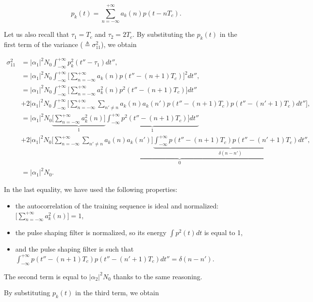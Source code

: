 \documentclass [a4paper, 11pt] {article}
\begin{document}
\begin{solution}
\begin{enumerate}
\begin{equation}
    p_k(t) = \sum_{n=-\infty}^{+\infty}a_k(n)p(t-nT_c).
\end{equation}

Let us also recall that $\tau_1 = T_c$ and $\tau_2 = 2T_c$.
By substituting the $p_k(t)$ in the first term of the variance ($\triangleq\sigma_{11}^2$), we obtain

\begin{align}
    \sigma_{11}^2 &=|\alpha_1|^2N_0 \int_{-\infty}^{+\infty}p_k^2(t''-\tau_{1})dt'', \\
    &= |\alpha_1|^2N_0 \int_{-\infty}^{+\infty}\Big[ \sum_{n=-\infty}^{+\infty}a_k(n)p(t''- (n+1)T_c) \Big]^2 dt'',\\
    &= |\alpha_1|^2N_0 \int_{-\infty}^{+\infty}\Big[ \sum_{n=-\infty}^{+\infty}a^2_k(n)p^2(t''- (n+1)T_c) \Big] dt'' \\
    &+ 2|\alpha_1|^2N_0 \int_{-\infty}^{+\infty}\Big[\sum_{n=-\infty}^{+\infty}\sum_{n'\neq n}a_k(n)a_k(n')p(t''- (n+1)T_c) p(t''- (n'+1)T_c) dt''\Big] \nonumber,\\
    &= |\alpha_1|^2N_0 \underbrace{\Big[ \sum_{n=-\infty}^{+\infty}a^2_k(n) \Big]}_{1} \underbrace{\int_{-\infty}^{+\infty} p^2(t''- (n+1)T_c) \Big] dt''}_{1} \\
    &+ 2|\alpha_1|^2N_0 \underbrace{\Big[\sum_{n=-\infty}^{+\infty}\sum_{n'\neq n}a_k(n)a_k(n') \Big] \underbrace{\int_{-\infty}^{+\infty} p(t''- (n+1)T_c) p(t''- (n'+1)T_c) dt''}_{\delta(n-n')}}_{0}\nonumber,\\
    &= |\alpha_1|^2N_0.
\end{align}

In the last equality, we have used the following properties:

\begin{itemize}
    \item the autocorrelation of the training sequence is ideal and normalized: $\big[ \sum_{n=-\infty}^{+\infty}a^2_k(n)\big] = 1$,
    \item the pulse shaping filter is normalized, so its energy $\int p^2(t) dt$ is equal to 1,
    \item and the pulse shaping filter is such that $\int_{-\infty}^{+\infty} p(t''- (n+1)T_c) p(t''- (n'+1)T_c) dt'' = \delta(n-n')$.
\end{itemize}

The second term is equal to $|\alpha_2|^2N_0$ thanks to the same reasoning.

By substituting $p_k(t)$ in the third term, we obtain


\end{enumerate}
\end{solution}
\end{document}

